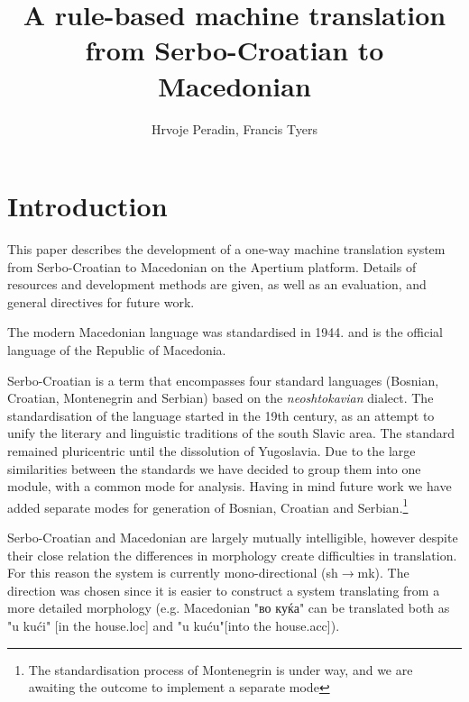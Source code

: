 \documentclass{book}
\title{A rule-based machine translation from Serbo-Croatian to Macedonian}
\author{Hrvoje Peradin, Francis Tyers}
\begin{document}
\frontmatter      %

\maketitle

\setcounter{page}{5}
\setcounter{tocdepth}{0}  %

\chapter{Introduction}

This paper describes the development of a one-way machine translation system
from Serbo-Croatian to Macedonian on the Apertium
platform.
Details of resources and development methods are given, as well as an
evaluation, and general directives for future work.

The modern Macedonian language was standardised in 1944. and
is the official language of the Republic of Macedonia.

Serbo-Croatian is a term that encompasses four standard languages 
(Bosnian, Croatian, Montenegrin and Serbian) based on the 
\emph{neoshtokavian} dialect. The standardisation of the language started
in the 19th century, as an attempt to unify the literary and linguistic 
traditions of the south Slavic area. The standard remained pluricentric
until the dissolution of Yugoslavia. Due to the large similarities between 
the standards we have decided to group them into one module, with a common
mode for analysis. Having in mind future work we have added separate modes 
for generation of Bosnian, Croatian and Serbian.\footnote{The standardisation
process of Montenegrin is under way, and we are awaiting the outcome to implement a separate
mode}

Serbo-Croatian and Macedonian are largely mutually intelligible, however despite their close relation the differences in morphology 
create difficulties in translation. For this reason the system is currently mono-directional (sh$\rightarrow$mk). 
The direction was chosen since it is easier to construct a system translating from a more detailed morphology 
(e.g. Macedonian "во куќа" can be translated both as "u kući" [in the house{\sc .loc}] and "u kuću"[into the house{\sc .acc}]).
\end{document}
